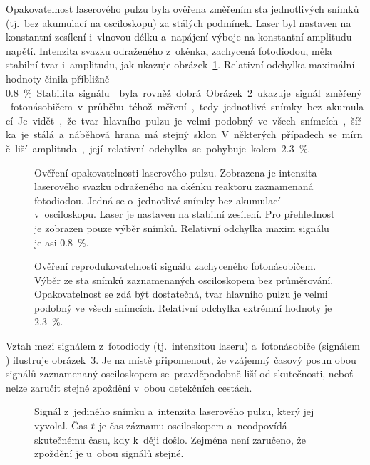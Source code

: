 Opakovatelnost laserového pulzu byla ověřena změřením sta jednotlivých
snímků (tj.~bez akumulací na osciloskopu) za stálých podmínek.
Laser byl nastaven na konstantní zesílení i~vlnovou délku
a~napájení výboje na konstantní amplitudu napětí.
Intenzita svazku odraženého z~okénka, zachycená fotodiodou,
měla stabilní tvar i~amplitudu, jak ukazuje
obrázek~\ref{fig:efish-pulse-compare}.
Relativní odchylka maximální hodnoty činila přibližně \SI{0.8}\percent.

Stabilita signálu \EFISH{} byla rovněž dobrá.
Obrázek~\ref{fig:efish-singleshots-compare} ukazuje signál
změřený fotonásobičem v~průběhu téhož měření,
tedy jednotlivé snímky bez akumulací.
Je vidět, že tvar hlavního pulzu je velmi podobný ve všech snímcích,
šířka je stálá a~náběhová hrana má stejný sklon.
V~některých případech se mírně liší amplituda,
její relativní odchylka se pohybuje kolem \SI{2.3}\percent.

\begin{figure}[htp]
	\centering
	
	\caption{Ověření opakovatelnosti laserového pulzu.
		Zobrazena je intenzita laserového svazku odraženého
		na okénku reaktoru zaznamenaná fotodiodou.
		Jedná se o~jednotlivé snímky bez akumulací v~osciloskopu.
		Laser je nastaven na stabilní zesílení.
		Pro přehlednost je zobrazen pouze výběr snímků.
		Relativní odchylka maxim signálu je asi \SI{0.8}\percent.}
	\label{fig:efish-pulse-compare}
\end{figure}

\begin{figure}[htp]
	\centering
	
	\caption{Ověření reprodukovatelnosti signálu \EFISH{} zachyceného
		fotonásobičem.
		Výběr ze sta snímků zaznamenaných osciloskopem bez průměrování.
		Opakovatelnost se zdá být dostatečná,
		tvar hlavního pulzu je velmi podobný ve všech snímcích.
		Relativní odchylka extrémní hodnoty je \SI{2.3}\percent.}
	\label{fig:efish-singleshots-compare}
\end{figure}

Vztah mezi signálem z~fotodiody (tj.~intenzitou laseru)
a~fotonásobiče (signálem \EFISH{}) ilustruje
obrázek~\ref{fig:efish-singleshot}.
Je na místě připomenout, že vzájemný časový posun obou signálů
zaznamenaný osciloskopem se~pravděpodobně liší od skutečnosti,
neboť nelze zaručit stejné zpoždění v~obou detekčních cestách.

\begin{figure}[htp]
	\centering
	
	\caption{Signál \EFISH{} z~jediného snímku
		a~intenzita laserového pulzu, který jej vyvolal.
		Čas $t$ je čas záznamu osciloskopem a~neodpovídá skutečnému času,
		kdy k~ději došlo.
		Zejména není zaručeno, že zpoždění je u~obou signálů stejné.}
	\label{fig:efish-singleshot}
\end{figure}

